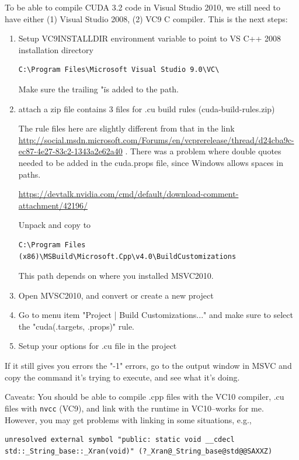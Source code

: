To be able to compile CUDA 3.2 code in Visual Studio 2010, we still need to have
either (1) Visual Studio 2008, (2) VC9 C compiler.  This is the next steps:
\begin{enumerate}
  \item  Setup
VC9INSTALLDIR environment variable to point to VS C++ 2008 installation directory
\begin{verbatim}
C:\Program Files\Microsoft Visual Studio 9.0\VC\
\end{verbatim}
 Make sure the trailing "\" is added to the path.
  
  \item attach a zip file contains 3 files for .cu build rules
  (cuda-build-rules.zip)
  
  The rule files here are slightly different from that in the link
  \url{http://social.msdn.microsoft.com/Forums/en/vcprerelease/thread/d24cba9c-ec87-4e27-83c2-1343a2e62a40}
. There was a problem where double quotes needed to be added in the cuda.props
file, since Windows allows spaces in paths.
  
\url{https://devtalk.nvidia.com/cmd/default/download-comment-attachment/42196/}
  
  Unpack and copy to
\begin{verbatim}
C:\Program Files (x86)\MSBuild\Microsoft.Cpp\v4.0\BuildCustomizations
\end{verbatim}
This path depends on where you installed MSVC2010.


  \item  Open MVSC2010, and convert or create a new project
  
  
  \item Go to menu item "Project | Build Customizations..." and make sure to
  select the "cuda(.targets, .props)" rule.
  
  \item Setup your options for .cu file in the project
\end{enumerate} 
If it still gives you errors the "-1" errors, go to the output window in MSVC
and copy the command it's trying to execute, and see what it's doing. 

Caveats: You should be able to compile .cpp files with the VC10 compiler, .cu
files with \verb!nvcc! (VC9), and link with the runtime in VC10--works for me. However,
you may get problems with linking in some situations, e.g.,
\begin{verbatim}
unresolved external symbol "public: static void __cdecl
std::_String_base::_Xran(void)" (?_Xran@_String_base@std@@SAXXZ)
\end{verbatim}

